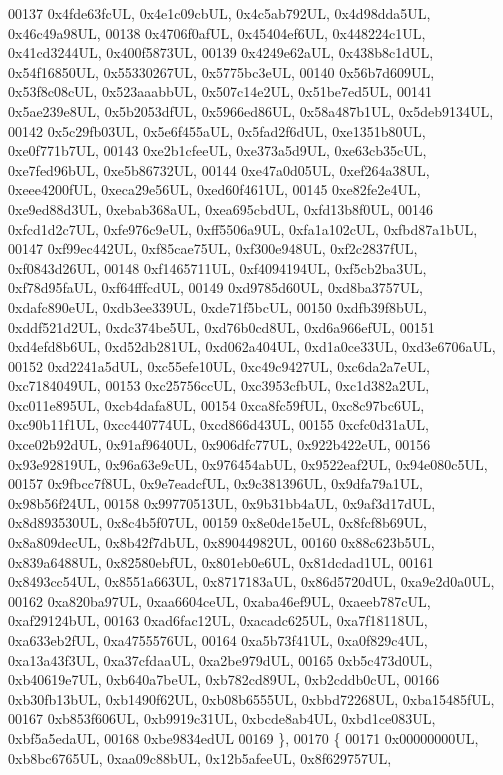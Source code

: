 \begin{DoxyCode}
00137     0x4fde63fcUL, 0x4e1c09cbUL, 0x4c5ab792UL, 0x4d98dda5UL, 0x46c49a98UL,
00138     0x4706f0afUL, 0x45404ef6UL, 0x448224c1UL, 0x41cd3244UL, 0x400f5873UL,
00139     0x4249e62aUL, 0x438b8c1dUL, 0x54f16850UL, 0x55330267UL, 0x5775bc3eUL,
00140     0x56b7d609UL, 0x53f8c08cUL, 0x523aaabbUL, 0x507c14e2UL, 0x51be7ed5UL,
00141     0x5ae239e8UL, 0x5b2053dfUL, 0x5966ed86UL, 0x58a487b1UL, 0x5deb9134UL,
00142     0x5c29fb03UL, 0x5e6f455aUL, 0x5fad2f6dUL, 0xe1351b80UL, 0xe0f771b7UL,
00143     0xe2b1cfeeUL, 0xe373a5d9UL, 0xe63cb35cUL, 0xe7fed96bUL, 0xe5b86732UL,
00144     0xe47a0d05UL, 0xef264a38UL, 0xeee4200fUL, 0xeca29e56UL, 0xed60f461UL,
00145     0xe82fe2e4UL, 0xe9ed88d3UL, 0xebab368aUL, 0xea695cbdUL, 0xfd13b8f0UL,
00146     0xfcd1d2c7UL, 0xfe976c9eUL, 0xff5506a9UL, 0xfa1a102cUL, 0xfbd87a1bUL,
00147     0xf99ec442UL, 0xf85cae75UL, 0xf300e948UL, 0xf2c2837fUL, 0xf0843d26UL,
00148     0xf1465711UL, 0xf4094194UL, 0xf5cb2ba3UL, 0xf78d95faUL, 0xf64fffcdUL,
00149     0xd9785d60UL, 0xd8ba3757UL, 0xdafc890eUL, 0xdb3ee339UL, 0xde71f5bcUL,
00150     0xdfb39f8bUL, 0xddf521d2UL, 0xdc374be5UL, 0xd76b0cd8UL, 0xd6a966efUL,
00151     0xd4efd8b6UL, 0xd52db281UL, 0xd062a404UL, 0xd1a0ce33UL, 0xd3e6706aUL,
00152     0xd2241a5dUL, 0xc55efe10UL, 0xc49c9427UL, 0xc6da2a7eUL, 0xc7184049UL,
00153     0xc25756ccUL, 0xc3953cfbUL, 0xc1d382a2UL, 0xc011e895UL, 0xcb4dafa8UL,
00154     0xca8fc59fUL, 0xc8c97bc6UL, 0xc90b11f1UL, 0xcc440774UL, 0xcd866d43UL,
00155     0xcfc0d31aUL, 0xce02b92dUL, 0x91af9640UL, 0x906dfc77UL, 0x922b422eUL,
00156     0x93e92819UL, 0x96a63e9cUL, 0x976454abUL, 0x9522eaf2UL, 0x94e080c5UL,
00157     0x9fbcc7f8UL, 0x9e7eadcfUL, 0x9c381396UL, 0x9dfa79a1UL, 0x98b56f24UL,
00158     0x99770513UL, 0x9b31bb4aUL, 0x9af3d17dUL, 0x8d893530UL, 0x8c4b5f07UL,
00159     0x8e0de15eUL, 0x8fcf8b69UL, 0x8a809decUL, 0x8b42f7dbUL, 0x89044982UL,
00160     0x88c623b5UL, 0x839a6488UL, 0x82580ebfUL, 0x801eb0e6UL, 0x81dcdad1UL,
00161     0x8493cc54UL, 0x8551a663UL, 0x8717183aUL, 0x86d5720dUL, 0xa9e2d0a0UL,
00162     0xa820ba97UL, 0xaa6604ceUL, 0xaba46ef9UL, 0xaeeb787cUL, 0xaf29124bUL,
00163     0xad6fac12UL, 0xacadc625UL, 0xa7f18118UL, 0xa633eb2fUL, 0xa4755576UL,
00164     0xa5b73f41UL, 0xa0f829c4UL, 0xa13a43f3UL, 0xa37cfdaaUL, 0xa2be979dUL,
00165     0xb5c473d0UL, 0xb40619e7UL, 0xb640a7beUL, 0xb782cd89UL, 0xb2cddb0cUL,
00166     0xb30fb13bUL, 0xb1490f62UL, 0xb08b6555UL, 0xbbd72268UL, 0xba15485fUL,
00167     0xb853f606UL, 0xb9919c31UL, 0xbcde8ab4UL, 0xbd1ce083UL, 0xbf5a5edaUL,
00168     0xbe9834edUL
00169   \},
00170   \{
00171     0x00000000UL, 0xb8bc6765UL, 0xaa09c88bUL, 0x12b5afeeUL, 0x8f629757UL,

\end{DoxyCode}
